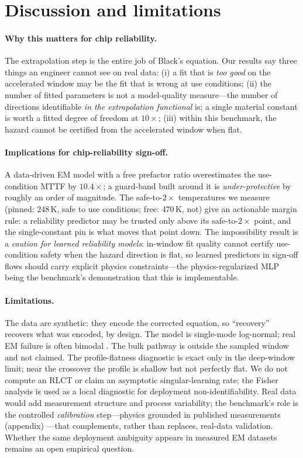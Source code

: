 \documentclass{article}
\begin{document}
\section{Discussion and limitations}

\paragraph{Why this matters for chip reliability.} The extrapolation step is
the entire job of Black's equation. Our results say three things an engineer
cannot see on real data: (i) a fit that is \emph{too good} on the accelerated
window may be the fit that is wrong at use conditions; (ii) the number of
fitted parameters is not a model-quality measure---the number of directions
identifiable \emph{in the extrapolation functional} is; a single material
constant is worth a fitted degree of freedom at $10\times$; (iii) within this
benchmark, the hazard cannot be certified from the accelerated window when
flat.

\paragraph{Implications for chip-reliability sign-off.} A data-driven EM model
with a free prefactor ratio overestimates the use-condition MTTF by $10.4\times$;
a guard-band built around it is \emph{under-protective} by roughly an order of
magnitude. The safe-to-$2\times$ temperatures we measure (pinned: $248$\,K,
safe to use conditions; free: $470$\,K, not) give an actionable margin rule: a
reliability predictor may be trusted only above its safe-to-$2\times$ point,
and the single-constant pin is what moves that point down. The impossibility
result is a \emph{caution for learned reliability models}: in-window fit
quality cannot certify use-condition safety when the hazard direction is flat,
so learned predictors in sign-off flows should carry explicit physics
constraints---the physics-regularized MLP being the benchmark's demonstration
that this is implementable.

\paragraph{Limitations.} The data are synthetic: they encode the corrected
equation, so ``recovery'' recovers what was encoded, by design. The model is
single-mode log-normal; real EM failure is often bimodal \citep{filippi09}. The
bulk pathway is outside the sampled window and not claimed. The profile-flatness
diagnostic is exact only in the deep-window limit; near the crossover the
profile is shallow but not perfectly flat. We do not compute an RLCT or claim
an asymptotic singular-learning rate; the Fisher analysis is used as a local
diagnostic for deployment non-identifiability. Real data would add measurement
structure and process variability; the benchmark's role is the controlled
\emph{calibration} step---physics grounded in published measurements (appendix)
---that complements, rather than replaces, real-data validation. Whether
the same deployment ambiguity appears in measured EM datasets remains an open
empirical question.
\end{document}
